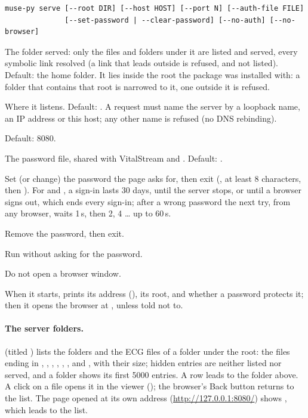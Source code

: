 \begin{lstlisting}[style=signature]
muse-py serve [--root DIR] [--host HOST] [--port N] [--auth-file FILE]
              [--set-password | --clear-password] [--no-auth] [--no-browser]
\end{lstlisting}

\begin{params}
\item[--root DIR] The folder served: only the files and folders under it are listed and served,
  every symbolic link resolved (a link that leads outside is refused, and not listed). Default:
  the home folder. It lies inside the root the package was installed with: a folder that
  contains that root is narrowed to it, one outside it is refused.
\item[--host HOST] Where it listens. Default: . A request must name the server
  by a loopback name, an IP address or this host; any other name is refused (no DNS rebinding).
\item[--port N] Default: 8080.
\item[--auth-file FILE] The password file, shared with VitalStream and .
  Default: .
\item[--set-password] Set (or change) the password the page asks for, then exit
  (, at least 8 characters, then ). For
   and , a sign-in lasts 30 days, until the server stops,
  or until a browser signs out, which ends every sign-in; after a wrong password the next try,
  from any browser, waits 1\,s, then 2, 4 \dots{} up to 60\,s.
\item[--clear-password] Remove the password, then exit.
\item[--no-auth] Run without asking for the password.
\item[--no-browser] Do not open a browser window.
\end{params}

When it starts,  prints its address (), its root, and whether a password protects it;
then it opens the browser at , unless told not to.

\paragraph{The server folders.}  (titled ) lists the
folders and the ECG files of a folder under the root: the files ending in ,
, , , , ,  and ,
with their size; hidden entries are neither listed nor served, and a folder shows its first 5000
entries. A row  leads to the folder above. A click on a file opens it in the viewer
(); the browser's Back button returns to the list. The page opened at its
own address (\url{http://127.0.0.1:8080/}) shows , which leads to the list.

